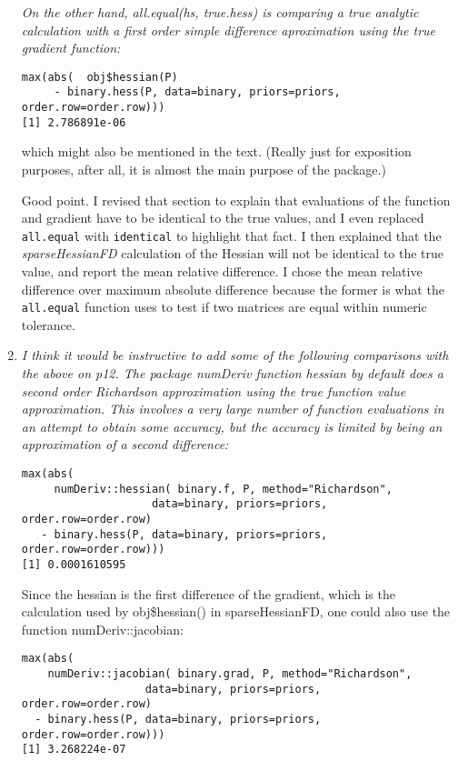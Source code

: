 \documentclass{article}
\newcommand{\code}[1]{\texttt{#1}}
\newcommand{\func}[1]{\code{#1}}
\newcommand{\class}[1]{\textsl{#1}}
\newenvironment{revQuote}{\itshape}{\vspace{\baselineskip}}
\newenvironment{response}{\normalfont}{\vspace{\baselineskip}}
\begin{document}
\begin{enumerate}
\begin{revQuote}
On the other hand, all.equal(hs, true.hess) is comparing a true analytic
calculation with a first order simple difference aproximation using the true
gradient function:
\begin{verbatim}
max(abs(  obj$hessian(P)
     - binary.hess(P, data=binary, priors=priors, order.row=order.row)))
[1] 2.786891e-06
\end{verbatim}

which might also be mentioned in the text. (Really just for exposition
purposes, after all, it is almost the main purpose of the package.)
  \end{revQuote}

\begin{response}
  Good point.  I revised that section to explain that evaluations of
  the function and gradient have to be identical to the true values,
  and I even replaced \func{all.equal} with \func{identical} to
  highlight that fact. I then explained that the
  \class{sparseHessianFD} calculation of the Hessian will not be
  identical to the true value, and report the mean relative
  difference.  I chose the mean relative difference over maximum
  absolute difference because the former is what the \func{all.equal}
  function uses to test if two matrices are equal within numeric tolerance.
\end{response}


\item \begin{revQuote}
I think it would be instructive to add some of the following comparisons
with the above on p12.  The package numDeriv function hessian by default
does a second order Richardson approximation using the true function value
approximation. This involves a very large number of function evaluations in
an attempt to obtain some accuracy, but the accuracy is limited by being an
approximation of a second difference:
\begin{verbatim}
max(abs(
     numDeriv::hessian( binary.f, P, method="Richardson", 
                    data=binary, priors=priors,
order.row=order.row) 
   - binary.hess(P, data=binary, priors=priors, order.row=order.row)))
[1] 0.0001610595

\end{verbatim}

Since the hessian is the first difference of the gradient, which is the
calculation used by obj\$hessian() in sparseHessianFD, one could also use the
function numDeriv::jacobian:

\begin{verbatim}
max(abs( 
    numDeriv::jacobian( binary.grad, P, method="Richardson", 
                   data=binary, priors=priors,
order.row=order.row)
  - binary.hess(P, data=binary, priors=priors, order.row=order.row)))
[1] 3.268224e-07
\end{verbatim}


\end{revQuote}
\end{enumerate}
\end{document}

